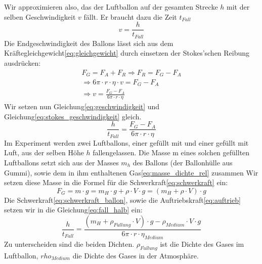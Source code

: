 \documentclass{article}
\begin{document}
    Wir approximieren also, das der Luftballon auf der gesamten Strecke \(h\) mit der selben Geschwindigkeit \(v\) fällt. Er braucht dazu die Zeit \(t_{Fall}\)
    \begin{equation} \label{eq:geschwindigkeit}
        v = \frac{h}{t_{Fall}}
    \end{equation}
    Die Endgeschwindigkeit des Ballons lässt sich aus dem Kräftegleichgewicht\ref{eq:gleichgewicht} durch einsetzen der Stokes'schen Reibung ausdrücken:
    \begin{equation}
        \begin{gathered} \label{eq:stokes_geschwindigkeit}
            F_G = F_A + F_R \Rightarrow F_R = F_G - F_A \\
            \Rightarrow 6 \pi \cdot r \cdot \eta \cdot v = F_G - F_A \\
            \Rightarrow v = \frac{ F_G - F_A }{ 6 \pi \cdot r \cdot \eta }
        \end{gathered}
    \end{equation}
    Wir setzen nun Gleichung\ref{eq:geschwindigkeit} und Gleichung\ref{eq:stokes_geschwindigkeit} gleich.
    \begin{equation} \label{eq:fall_halb}
        \frac{h}{t_{Fall}} = \frac{ F_G - F_A }{ 6 \pi \cdot r \cdot \eta }
    \end{equation}
    Im Experiment werden zwei Luftballons, einer gefüllt mit  und einer gefüllt mit Luft, aus der selben Höhe \(h\) fallengelassen.
    Die Masse m eines solchen gefüllten Luftballons setzt sich aus der Masses \( m_h \) des Ballons (der Ballonhülle aus Gummi), sowie dem in ihm enthaltenen Gas\ref{eq:masse_dichte_rel} zusammen
    Wir setzen diese Masse in die Formel für die Schwerkraft\ref{eq:schwerkraft} ein:
    \begin{equation} \label{eq:schwerkraft_ballon}
        F_G = m \cdot g = m_H \cdot g + \rho \cdot V \cdot g = \left( m_H + \rho \cdot V \right) \cdot g
    \end{equation}
    Die Schwerkraft\ref{eq:schwerkraft_ballon}, sowie die Auftriebskraft\ref{eq:auftrieb} setzen wir in die Gleichung\ref{eq:fall_halb} ein:
    \begin{equation} \label{eq:fall}
        \frac{h}{t_{Fall}} = \frac{ \left( m_H + \rho_{F\ddot{u}llung} \cdot V \right) \cdot g - \rho_{Medium} \cdot V \cdot g }{ 6 \pi \cdot r \cdot \eta_{Medium} }
    \end{equation}
    Zu unterscheiden sind die beiden Dichten. \(\rho_{F\ddot{u}llung}\) ist die Dichte des Gases im Luftballon, \(rho_{Medium}\) die Dichte des Gases in der Atmosphäre.
\end{document}
